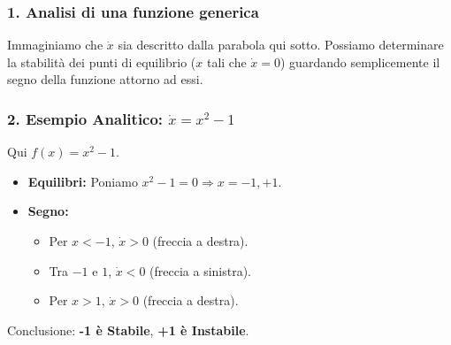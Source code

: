 \documentclass[openany]{book}
\theoremstyle{definition}
\theoremstyle{remark}
\begin{document}
\subsubsection*{1. Analisi di una funzione generica}
Immaginiamo che $\dot{x}$ sia descritto dalla parabola qui sotto. 
Possiamo determinare la stabilità dei punti di equilibrio ($x$ tali che $\dot{x}=0$) guardando semplicemente il segno della funzione attorno ad essi.

\begin{center}
\end{center}

\subsubsection*{2. Esempio Analitico: $\dot{x} = x^2 - 1$}
Qui $f(x) = x^2 - 1$.
\begin{itemize}
    \item \textbf{Equilibri:} Poniamo $x^2 - 1 = 0 \Rightarrow x = -1, +1$.
    \item \textbf{Segno:} 
    \begin{itemize}
        \item Per $x < -1$, $\dot{x} > 0$ (freccia a destra).
        \item Tra $-1$ e $1$, $\dot{x} < 0$ (freccia a sinistra).
        \item Per $x > 1$, $\dot{x} > 0$ (freccia a destra).
    \end{itemize}
\end{itemize}
Conclusione: \textbf{-1 è Stabile}, \textbf{+1 è Instabile}.
\end{document}
